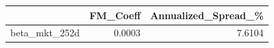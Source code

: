 \begin{tabular}{lrr}
\toprule
 & FM\_Coeff & Annualized\_Spread\_\% \\
\midrule
beta\_mkt\_252d & 0.0003 & 7.6104 \\
\bottomrule
\end{tabular}
